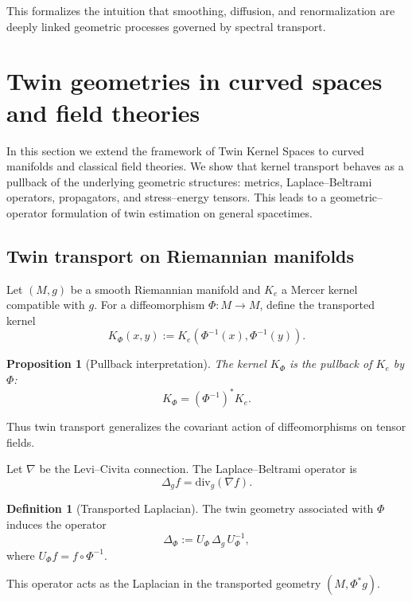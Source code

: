\documentclass[11pt]{article}
\newtheorem{proposition}[theorem]{Proposition}
\theoremstyle{definition}
\newtheorem{definition}[theorem]{Definition}
\begin{document}
This formalizes the intuition that smoothing, diffusion, and renormalization are deeply linked geometric processes governed by spectral transport.

	
\section{Twin geometries in curved spaces and field theories}
\label{sec:curved}

In this section we extend the framework of Twin Kernel Spaces to curved manifolds and classical field theories.
We show that kernel transport behaves as a pullback of the underlying geometric structures:
metrics, Laplace–Beltrami operators, propagators, and stress–energy tensors.
This leads to a geometric–operator formulation of twin estimation on general spacetimes.

\subsection{Twin transport on Riemannian manifolds}

Let $(M,g)$ be a smooth Riemannian manifold and $K_e$ a Mercer kernel compatible with $g$.
For a diffeomorphism $\Phi:M\to M$, define the transported kernel
\[
K_\Phi(x,y) := K_e(\Phi^{-1}(x),\Phi^{-1}(y)).
\]

\begin{proposition}[Pullback interpretation]
	The kernel $K_\Phi$ is the pullback of $K_e$ by $\Phi$:
	\[
	K_\Phi = (\Phi^{-1})^\ast K_e.
	\]
\end{proposition}

Thus twin transport generalizes the covariant action of diffeomorphisms on tensor fields.

Let $\nabla$ be the Levi–Civita connection.
The Laplace–Beltrami operator is
\[
\Delta_g f = \mathrm{div}_g(\nabla f).
\]

\begin{definition}[Transported Laplacian]
	The twin geometry associated with $\Phi$ induces the operator
	\[
	\Delta_\Phi := U_\Phi \,\Delta_g\, U_\Phi^{-1},
	\]
	where $U_\Phi f = f\circ\Phi^{-1}$.
\end{definition}

This operator acts as the Laplacian in the transported geometry $(M,\Phi^\ast g)$.
\end{document}
